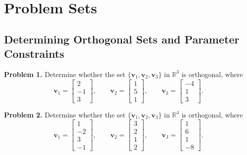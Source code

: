 \documentclass[11pt, letterpaper]{article}
\theoremstyle{definition}
\theoremstyle{remark}
\begin{document}
\newpage

\section{Problem Sets}

\subsection{Determining Orthogonal Sets and Parameter Constraints}

\textbf{Problem 1.} Determine whether the set $\{\mathbf{v}_1, \mathbf{v}_2, \mathbf{v}_3\}$ in $\mathbb{R}^3$ is orthogonal, where
\[
\mathbf{v}_1 = \begin{bmatrix} 2 \\ -1 \\ 3 \end{bmatrix}, \qquad
\mathbf{v}_2 = \begin{bmatrix} 1 \\ 5 \\ 1 \end{bmatrix}, \qquad
\mathbf{v}_3 = \begin{bmatrix} -4 \\ 1 \\ 3 \end{bmatrix}.
\]

\textbf{Problem 2.} Determine whether the set $\{\mathbf{v}_1, \mathbf{v}_2, \mathbf{v}_3\}$ in $\mathbb{R}^4$ is orthogonal, where
\[
\mathbf{v}_1 = \begin{bmatrix} 1 \\ -2 \\ 3 \\ -1 \end{bmatrix}, \qquad
\mathbf{v}_2 = \begin{bmatrix} 3 \\ 2 \\ 1 \\ 2 \end{bmatrix}, \qquad
\mathbf{v}_3 = \begin{bmatrix} 1 \\ 6 \\ 1 \\ -8 \end{bmatrix}.
\]
\end{document}
